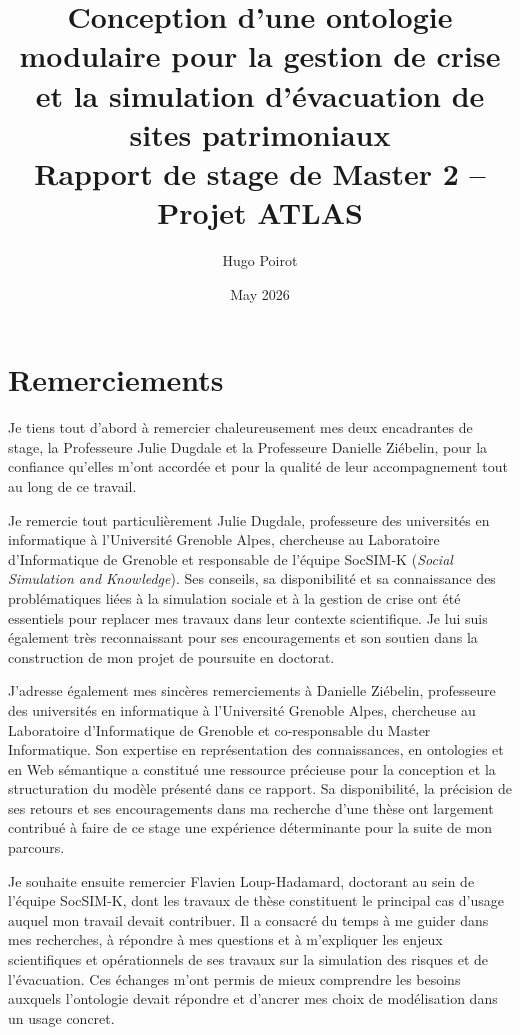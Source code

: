 \documentclass{article}
\title{Conception d'une ontologie modulaire pour la gestion de crise et la simulation d'évacuation de sites patrimoniaux\\[0.4em]
\large Rapport de stage de Master 2 -- Projet ATLAS}
\author{Hugo Poirot}
\date{May 2026}
\begin{document}
\maketitle
\clearpage

\section*{Remerciements}

Je tiens tout d'abord à remercier chaleureusement mes deux encadrantes de stage, la Professeure Julie Dugdale et la Professeure Danielle Ziébelin, pour la confiance qu'elles m'ont accordée et pour la qualité de leur accompagnement tout au long de ce travail.

Je remercie tout particulièrement Julie Dugdale, professeure des universités en informatique à l'Université Grenoble Alpes, chercheuse au Laboratoire d'Informatique de Grenoble et responsable de l'équipe SocSIM-K (\textit{Social Simulation and Knowledge}). Ses conseils, sa disponibilité et sa connaissance des problématiques liées à la simulation sociale et à la gestion de crise ont été essentiels pour replacer mes travaux dans leur contexte scientifique. Je lui suis également très reconnaissant pour ses encouragements et son soutien dans la construction de mon projet de poursuite en doctorat.

J'adresse également mes sincères remerciements à Danielle Ziébelin, professeure des universités en informatique à l'Université Grenoble Alpes, chercheuse au Laboratoire d'Informatique de Grenoble et co-responsable du Master Informatique. Son expertise en représentation des connaissances, en ontologies et en Web sémantique a constitué une ressource précieuse pour la conception et la structuration du modèle présenté dans ce rapport. Sa disponibilité, la précision de ses retours et ses encouragements dans ma recherche d'une thèse ont largement contribué à faire de ce stage une expérience déterminante pour la suite de mon parcours.

Je souhaite ensuite remercier Flavien Loup-Hadamard, doctorant au sein de l'équipe SocSIM-K, dont les travaux de thèse constituent le principal cas d'usage auquel mon travail devait contribuer. Il a consacré du temps à me guider dans mes recherches, à répondre à mes questions et à m'expliquer les enjeux scientifiques et opérationnels de ses travaux sur la simulation des risques et de l'évacuation. Ces échanges m'ont permis de mieux comprendre les besoins auxquels l'ontologie devait répondre et d'ancrer mes choix de modélisation dans un usage concret.
\end{document}
